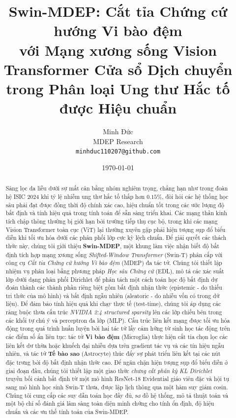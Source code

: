 \documentclass[11pt]{article}
\title{%
  \textbf{Swin-MDEP: Cắt tỉa Chứng cứ hướng Vi bào đệm\\
  với Mạng xương sống Vision Transformer Cửa sổ Dịch chuyển\\
  trong Phân loại Ung thư Hắc tố được Hiệu chuẩn}%
}
\author{
  Minh Đức \\
  MDEP Research \\
  \texttt{minhduc110207@github.com}
}
\date{\today}
\begin{document}
\maketitle

\begin{abstract}
Sàng lọc da liễu dưới sự mất cân bằng nhóm nghiêm trọng, chẳng hạn như trong đoàn hệ ISIC 2024 khi tỷ lệ nhiễm ung thư hắc tố thấp hơn $0.15\%$, đòi hỏi các hệ thống học sâu phải đạt được đồng thời độ chính xác cao, hiệu chuẩn tốt trong các ước lượng độ bất định và tính hiệu quả trong tính toán để sẵn sàng triển khai. Các mạng thần kinh tích chập thông thường bị giới hạn bởi trường tiếp thụ cục bộ, trong khi các mạng Vision Transformer toàn cục (ViT) lại thường xuyên gặp phải hiện tượng sụp đổ biểu diễn khi tối ưu hóa dưới các phân phối lớp cực kỳ lệch chuẩn. Để giải quyết các thách thức này, chúng tôi giới thiệu \textbf{Swin-MDEP}, một khung làm việc nhận biết độ bất định tích hợp mạng xương sống \emph{Shifted-Window Transformer} (Swin-T) phân cấp với công cụ \emph{Cắt tỉa Chứng cứ hướng Vi bào đệm} (MDEP) đa tác tử. Chúng tôi thiết lập nhiệm vụ phân loại bằng phương pháp \emph{Học sâu Chứng cứ} (EDL), mô tả các xác suất lớp dưới dạng phân phối Dirichlet để phân tách một cách toán học độ bất định dự đoán thành các thành phần riêng biệt gồm bất định nhận thức (epistemic - do thiếu tri thức của mô hình) và bất định ngẫu nhiên (aleatoric - do nhiễu vốn có trong dữ liệu). Để đảm bảo tính hiệu quả khi chạy thực tế (test-time), chúng tôi áp dụng các ràng buộc thưa cấu trúc \emph{NVIDIA 2:4 structured sparsity} lên các lớp chiếu bên trong các khối tự chú ý và perceptron đa lớp (MLP). Cấu trúc liên kết mạng được tối ưu hóa động trong quá trình huấn luyện bởi hai tác tử lấy cảm hứng từ sinh học tác động trên các điểm số ẩn liên tục: tác tử \textbf{Vi bào đệm} (Microglia) thực hiện cắt tỉa chọn lọc các liên kết dư thừa hoặc khuếch đại nhiễu dựa trên gradient tác vụ và các tín hiệu ngẫu nhiên, và tác tử \textbf{Tế bào sao} (Astrocyte) thúc đẩy sự phát triển liên kết tại các nút đặc trưng bởi độ bất định nhận thức cao. Để ngăn chặn hiện tượng sụp đổ biểu diễn ở giai đoạn đầu, chúng tôi thiết lập một giao thức \emph{chưng cất phân kỳ KL Dirichlet} truyền bối cảnh bất định từ một mô hình ResNet-18 Evidential giáo viên đặc và hội tụ sang mô hình học sinh Swin-T thưa, được lập lịch thông qua một hàm suy giảm cosin. Chúng tôi cung cấp các suy dẫn toán học đầy đủ, sơ đồ hệ thống, mô tả thuật toán và một bộ chỉ số đánh giá lâm sàng toàn diện minh chứng cho tính ổn định, độ hiệu chuẩn và các ưu thế tính toán của Swin-MDEP.
\end{abstract}
\end{document}
